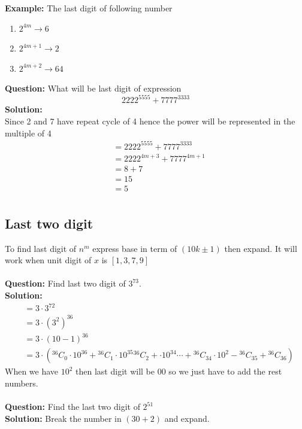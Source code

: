 \documentclass[12pt]{article}
\begin{document}
\textbf{Example: }The last digit of following number
\begin{enumerate}
    \item $2^{4m} \rightarrow 6$
    \item $2^{4m+1} \rightarrow 2$
    \item $2^{4m+2} \rightarrow 64$
\end{enumerate}
\textbf{Question: }What will be last digit of expression \\
\[
2222^{5555}+7777^{3333}
\]
\textbf{Solution: }\\
Since 2 and 7 have repeat cycle of 4 hence the power will be represented in the multiple of 4\\ 
\[
\begin{aligned}
    &=2222^{5555}+7777^{3333} \\
    &= 2222^{4m+3}+7777^{4m+1} \\
    &=8+7 \\
    &=15 \\
    &=5 \\
\end{aligned}
\]
\newpage
\subsection{Last two digit}
To find last digit of $n^m$ express base in term of $(10k \pm 1)$ then expand. It will work when unit digit of $x$ is $[1,3,7,9]$ \\
\\
\textbf{Question: }Find last two digit of $3^{73}$.
\\ 
\textbf{Solution: }
\[
\begin{aligned}
    &= 3 \cdot 3^{72} \\
    &= 3 \cdot (3^2)^{36} \\
    &= 3 \cdot (10-1)^{36} \\
    &= 3 \cdot (
    {}^{36}C_{0} \cdot10^{36}+
    {}^{36}C_{1} \cdot10^{35}
    {}^{36}C_{2}+ \cdot10^{34} \cdots +
    {}^{36}C_{34} \cdot 10^{2}-
    {}^{36}C_{35}+
    {}^{36}C_{36})
\end{aligned}
\]
When we have $10^2$ then last digit will be $00$ so we just have to add the rest numbers. \\
\\
\textbf{Question: }Find the last two digit of $2^{51}$ \\
\textbf{Solution: }Break the number in $(30+2)$ and expand.
\end{document}
